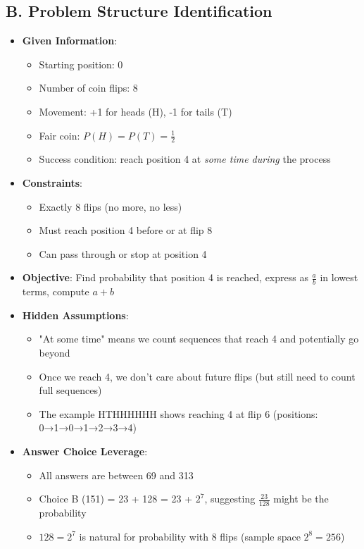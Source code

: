 \documentclass[]{article}
\begin{document}
\begin{problemconfigbox}
\subsection*{B. Problem Structure Identification}
\begin{itemize}[leftmargin=*]
    \item \textbf{Given Information}: 
    \begin{itemize}
        \item Starting position: 0
        \item Number of coin flips: 8
        \item Movement: +1 for heads (H), -1 for tails (T)
        \item Fair coin: $P(H) = P(T) = \frac{1}{2}$
        \item Success condition: reach position 4 at \textit{some time during} the process
    \end{itemize}
    \item \textbf{Constraints}: 
    \begin{itemize}
        \item Exactly 8 flips (no more, no less)
        \item Must reach position 4 before or at flip 8
        \item Can pass through or stop at position 4
    \end{itemize}
    \item \textbf{Objective}: Find probability that position 4 is reached, express as $\frac{a}{b}$ in lowest terms, compute $a+b$
    \item \textbf{Hidden Assumptions}: 
    \begin{itemize}
        \item "At some time" means we count sequences that reach 4 and potentially go beyond
        \item Once we reach 4, we don't care about future flips (but still need to count full sequences)
        \item The example HTHHHHHH shows reaching 4 at flip 6 (positions: 0→1→0→1→2→3→4)
    \end{itemize}
    \item \textbf{Answer Choice Leverage}: 
    \begin{itemize}
        \item All answers are between 69 and 313
        \item Choice B (151) = 23 + 128 = 23 + $2^7$, suggesting $\frac{23}{128}$ might be the probability
        \item $128 = 2^7$ is natural for probability with 8 flips (sample space $2^8 = 256$)
    \end{itemize}
\end{itemize}


\end{problemconfigbox}
\end{document}
